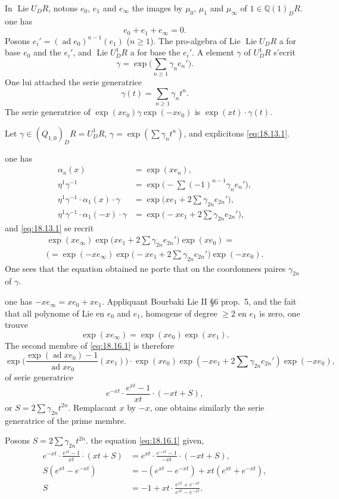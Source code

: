 \documentclass[12pt,a4paper]{article}
\theoremstyle{plain}
\theoremstyle{definition}
\theoremstyle{remark}
\DeclareMathOperator{\Lie}{Lie}
\DeclareMathOperator{\ad}{ad}
\newcommand{\dR}{DR}
\newcommand{\QQ}{\mathbb{Q}}
\begin{document}
In $\Lie U_\dR$, notons $e_0$, $e_1$ and $e_\infty$ the images by
$\mu_0$, $\mu_1$ and $\mu_\infty$ of $1 \in \QQ(1)_\dR$. one has
\[
e_0 + e_1 + e_\infty = 0.
\]
Posons $e_i' = (\ad e_0)^{n-1}(e_1)$ ($n \geq 1$). The pro-algebra of
Lie $\Lie U_\dR$ a for base $e_0$ and the $e_i'$, and
$\Lie U^1_\dR$ a for base the $e_i'$. A element $\gamma$ of
$U^1_\dR$ s'ecrit
\[
\gamma = \exp\bigl(\sum_{n \geq 1} \gamma_n e_n'\bigr).
\]
One lui attached the serie generatrice
\[
\gamma(t) = \sum_{n \geq 1} \gamma_n t^n.
\]
The serie generatrice of $\exp(xe_0) \gamma \exp(-xe_0)$ is
$\exp(xt) \cdot \gamma(t)$.

Let $\gamma \in (Q_{1,0})_\dR = U^1_\dR$,
$\gamma = \exp(\sum \gamma_n t^n)$, and explicitons
\eqref{eq:18.13.1}.

one has
\begin{align*}
\alpha_a(x) &= \exp(xe_a), \\
\eta^1 \gamma^{-1} &= \exp\bigl(-\sum (-1)^{n-1} \gamma_n
e_n'\bigr), \\
\eta^1 \gamma^{-1} \cdot \alpha_1(x) \cdot \gamma &=
\exp\bigl(xe_1 + 2\sum \gamma_{2n} e_{2n}'\bigr), \\
\eta^1 \gamma^{-1} \cdot \alpha_1(-x) \cdot \gamma &=
\exp\bigl(-xe_1 + 2\sum \gamma_{2n} e_{2n}'\bigr),
\end{align*}
and \eqref{eq:18.13.1} se recrit
\begin{multline}\label{eq:18.16.1}
\exp(xe_\infty) \exp\bigl(xe_1 + 2\sum \gamma_{2n}
e_{2n}'\bigr) \exp(xe_0) = \\(= 
\exp(-xe_\infty) \exp\bigl(-xe_1 + 2\sum \gamma_{2n}
e_{2n}'\bigr) \exp(-xe_0).
\end{multline}
One sees that the equation obtained ne porte that on the coordonnees
paires $\gamma_{2n}$ of $\gamma$.

one has $-xe_\infty = xe_0 + xe_1$. Appliquant Bourbaki Lie II \S 6
prop.\ 5, and the fait that all polynome of Lie en $e_0$ and $e_1$,
homogene of degree $\geq 2$ en $e_1$ is zero, one trouve
\[
\exp(xe_\infty) = \exp(xe_0) \exp(xe_1).
\]
The second membre of \eqref{eq:18.16.1} is therefore
\[
\exp\bigl(\frac{\exp(\ad xe_0) - 1}{\ad xe_0}(xe_1)\bigr)
\cdot \exp(xe_0) \exp(-xe_1 + 2\sum \gamma_{2n} e_{2n}')
\exp(-xe_0),
\]
of serie generatrice
\[
e^{-xt} \cdot \frac{e^{xt} - 1}{xt} \cdot (-xt + S),
\]
or $S = 2\sum \gamma_{2n} t^{2n}$. Remplacant $x$ by $-x$, one obtains similarly the serie generatrice of the prime membre.

Posons $S = 2\sum \gamma_{2n} t^{2n}$. the equation
\eqref{eq:18.16.1} given,
\begin{align*}
e^{-xt} \cdot \frac{e^{xt}-1}{xt} \cdot (xt + S) &= e^{xt}
\cdot \frac{e^{-xt}-1}{-xt} \cdot (-xt + S), \\
S(e^{xt} - e^{-xt}) &= -(e^{xt} - e^{-xt}) + xt(e^{xt} + e^{-xt}),
\\
S &= -1 + xt \cdot \frac{e^{xt} + e^{-xt}}{e^{xt} - e^{-xt}}.
\end{align*}
\end{document}
